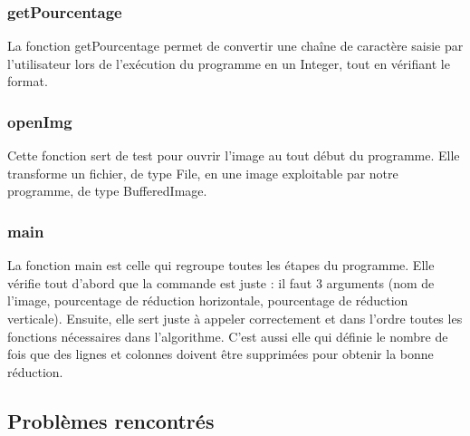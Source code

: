 \documentclass[12pt]{article}
\begin{document}
\subsubsection{getPourcentage}
La fonction getPourcentage permet de convertir une chaîne de caractère saisie par l'utilisateur lors de l'exécution du programme en un Integer, tout en vérifiant le format.

\subsubsection{openImg}
Cette fonction sert de test pour ouvrir l'image au tout début du programme. Elle transforme un fichier, de type File, en une image exploitable par notre programme, de type BufferedImage.

\subsubsection{main}
La fonction main est celle qui regroupe toutes les étapes du programme. Elle vérifie tout d'abord que la commande est juste : il faut 3 arguments (nom de l'image, pourcentage de réduction horizontale, pourcentage de réduction verticale). Ensuite, elle sert juste à appeler correctement et dans l'ordre toutes les fonctions nécessaires dans l'algorithme. C'est aussi elle qui définie le nombre de fois que des lignes et colonnes doivent être supprimées pour obtenir la bonne réduction.


\subsection{Problèmes rencontrés}
\end{document}
